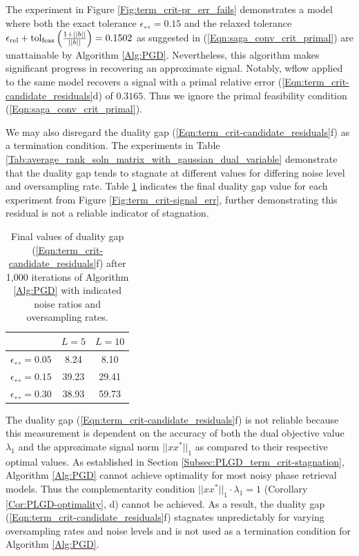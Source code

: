 
The experiment in Figure \ref{Fig:term_crit-pr_err_fails} demonstrates a model where both the exact tolerance $\epsilon_\rel = 0.15$ and the relaxed tolerance $ \epsilon_{\textnormal{rel}} + \textnormal{tol}_\textnormal{feas} \left(\frac{1 + ||b||}{||b||}\right) =0.1502$ as suggested in (\ref{Eqn:saga_conv_crit_primal}) are unattainable by Algorithm \ref{Alg:PGD}.  Nevertheless, this algorithm makes significant progress in recovering an approximate signal.  Notably, wflow applied to the same model recovers a signal with a primal relative error (\ref{Eqn:term_crit-candidate_residuals}d) of $0.3165$.  Thus we ignore the primal feasibility condition (\ref{Eqn:saga_conv_crit_primal}).


We may also disregard the duality gap (\ref{Eqn:term_crit-candidate_residuals}f) as a termination condition.  The experiments in Table \ref{Tab:average_rank_soln_matrix_with_gaussian_dual_variable} demonstrate that the duality gap tends to stagnate at different values for differing noise level and oversampling rate.  Table \ref{Tab:term_crit-duality_gap_stagnates} indicates the final duality gap value for each experiment from Figure \ref{Fig:term_crit-signal_err}, further demonstrating this residual is not a reliable indicator of stagnation.

\begin{table}[H]
\centering
\begin{tabular}{ |c|c|c| }
\hline
&	$L = 5$
	&	$L = 10$	\\
 \hline
$\epsilon_\rel = 0.05$
&     8.24 &   8.10 		\\
 \hline
$\epsilon_\rel = 0.15$
&  39.23 &  29.41 	\\
 \hline
$\epsilon_\rel = 0.30$
&  38.93 &  59.73	\\
 \hline
\end{tabular}
	\caption{Final values of duality gap (\ref{Eqn:term_crit-candidate_residuals}f) after 1,000 iterations of Algorithm \ref{Alg:PGD} with indicated noise ratios and oversampling rates.}
	\label{Tab:term_crit-duality_gap_stagnates}
\end{table}

The duality gap (\ref{Eqn:term_crit-candidate_residuals}f) is not reliable because this measurement is dependent on the accuracy of both the dual objective value $\lambda_1$ and the approximate signal norm $||xx^*||_1$ as compared to their respective optimal values.  As established in Section \ref{Subsec:PLGD_term_crit-stagnation}, Algorithm \ref{Alg:PGD} cannot achieve optimality for most noisy phase retrieval models.  Thus the complementarity condition $||xx^*||_1 \cdot \lambda_1 = 1$ (Corollary \ref{Cor:PLGD-optimality}, d) cannot be achieved.  As a result, the duality gap (\ref{Eqn:term_crit-candidate_residuals}f) stagnates unpredictably for varying oversampling rates and noise levels and is not used as a termination condition for Algorithm \ref{Alg:PGD}.



